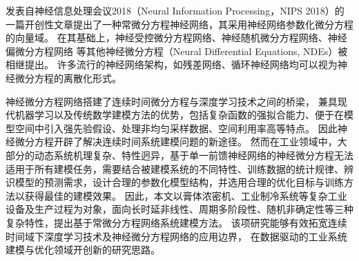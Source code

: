 发表自神经信息处理会议2018（Neural Information Processing，NIPS 2018）的一篇开创性文章\cite{chen2018neural}提出了一种常微分方程神经网络，其采用神经网络参数化微分方程的向量域\cite{kidger2021}。
在其基础上，神经受控微分方程网络\cite{kidger2020neural}、神经随机微分方程网络\cite{li2020scalable}、神经偏微分方程网络
\cite{li2020fourier}等其他神经微分方程（Neural Differential Equations, NDEs）被相继提出。
许多流行的神经网络架构，如残差网络、循环神经网络均可以视为神经微分方程的离散化形式。


神经微分方程网络搭建了连续时间微分方程与深度学习技术之间的桥梁，
兼具现代机器学习以及传统数学建模方法的优势，包括复杂函数的强拟合能力、便于在模型空间中引入强先验假设、处理非均匀采样数据、空间利用率高等特点。
因此神经微分方程开辟了解决连续时间系统建模问题的新途径。
然而在工业领域中，大部分的动态系统机理复杂、特性迥异，基于单一前馈神经网络的神经微分方程无法适用于所有建模任务，需要结合被建模系统的不同特性、训练数据的统计规律、辨识模型的预测需求，设计合理的参数化模型结构，并选用合理的优化目标与训练方法以获得最佳的建模效果。
因此，本文以膏体浓密机、工业制冷系统等复杂工业设备及生产过程为对象，面向长时延非线性、周期多阶段性、随机非确定性等三种复杂特性，提出基于常微分方程网络系统建模方法。
该项研究能够有效拓宽连续时间域下深度学习技术及神经微分方程网络的应用边界，
在数据驱动的工业系统建模与优化领域开创新的研究思路。
